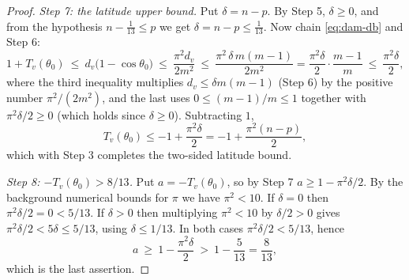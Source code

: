 \begin{proof}
\emph{Step 7: the latitude upper bound.} Put $\delta=n-p$. By Step 5,
$\delta\ge0$, and from the hypothesis $n-\tfrac1{13}\le p$ we get
$\delta=n-p\le\tfrac1{13}$. Now chain \eqref{eq:dam-db} and Step 6:
\[
  1+T_v(\theta_0)
  \ \le\ d_v\bigl(1-\cos\theta_0\bigr)
  \ \le\ \frac{\pi^2d_v}{2m^2}
  \ \le\ \frac{\pi^2\,\delta\,m(m-1)}{2m^2}
  =\frac{\pi^2\delta}{2}\cdot\frac{m-1}{m}
  \ \le\ \frac{\pi^2\delta}{2},
\]
where the third inequality multiplies $d_v\le\delta m(m-1)$ (Step 6) by the
positive number $\pi^2/(2m^2)$, and the last uses $0\le(m-1)/m\le1$ together
with $\pi^2\delta/2\ge0$ (which holds since $\delta\ge0$). Subtracting $1$,
\[
  T_v(\theta_0)\le-1+\frac{\pi^2\delta}{2}=-1+\frac{\pi^2(n-p)}{2},
\]
which with Step 3 completes the two-sided latitude bound.

\emph{Step 8: $-T_v(\theta_0)>8/13$.} Put $a=-T_v(\theta_0)$, so by Step 7
$a\ge1-\pi^2\delta/2$. By the background numerical bounds for $\pi$ we have
$\pi^2<10$. If $\delta=0$ then $\pi^2\delta/2=0<5/13$. If $\delta>0$ then
multiplying $\pi^2<10$ by $\delta/2>0$ gives
$\pi^2\delta/2<5\delta\le5/13$, using $\delta\le1/13$. In both cases
$\pi^2\delta/2<5/13$, hence
\[
  a\ \ge\ 1-\frac{\pi^2\delta}{2}\ >\ 1-\frac5{13}=\frac8{13},
\]
which is the last assertion.
\end{proof}
